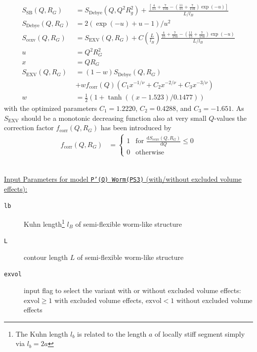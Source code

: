 \begin{align}
S_\textrm{SB}(Q,R_G) &= S_\mathrm{Debye}(Q,Q^2 R_g^2)+
    \frac{\left[\frac{4}{15} +\frac{7}{15u}-\left(\frac{11}{15}+\frac{7}{15u}\right)\exp(-u)\right]}{L/l_B}\\
S_\textrm{Debye}(Q,R_G) &= 2\left(\exp(-u)+u-1\right)/u^2\\
S_\textrm{cexv}(Q,R_G) &= S_\textrm{EXV}(Q,R_G)  +C\left(\frac{L}{l_B}\right)\frac{\frac{4}{15}+\frac{7}{15u}-\left(\frac{11}{15}+\frac{7}{15u}\right)\exp(-u)}{L/l_B} \\
u &= Q^2R_G^2 \\
x &= QR_G \\
S_\textrm{EXV}(Q,R_G) &= (1-w)S_\textrm{Debye}(Q,R_G) \\
&+ w f_\textrm{corr}(Q) \left(C_1x^{-1/\nu}+C_2x^{-2/\nu}+C_3x^{-3/\nu}\right) \nonumber \\
w &= \frac12\left(1+\tanh((x-1.523)/0.1477)\right)
\end{align}
with the optimized parameters $C_1 = 1.2220$, $C_2 = 0.4288$, and $C_3 = -1.651$.
As $S_\textrm{EXV}$ should be a monotonic decreasing function also at very small $Q$-values the correction factor $f_\textrm{corr}(Q,R_G)$ has been introduced by \cite{Chen2006}
\begin{align}
f_\textrm{corr}(Q,R_G) &=
\begin{cases}
1 & \mbox{for~} \frac{\mathrm{d}S_\textrm{cexv}(Q,R_G)}{\mathrm{d}Q} \leq 0\\
0 & \mbox{otherwise}
\end{cases}
\end{align}
\vspace{5mm}

\hspace{1pt}\\
\underline{Input Parameters for model \texttt{P'(Q) Worm(PS3)} (with/without excluded volume effects):}\\
\begin{description}
\item[\texttt{lb}] Kuhn length\footnote{The Kuhn length $l_b$ is related to the length $a$ of
    locally stiff segment simply via $l_b=2a$} $l_B$ of semi-flexible worm-like structure
\item[\texttt{L}] contour length $L$ of semi-flexible worm-like structure
\item[\texttt{exvol}] input flag to select the variant with or without excluded volume effects: $\mathrm{exvol} \geq 1$ with excluded volume effects, $\mathrm{exvol} < 1$ without excluded volume effects
\end{description}


